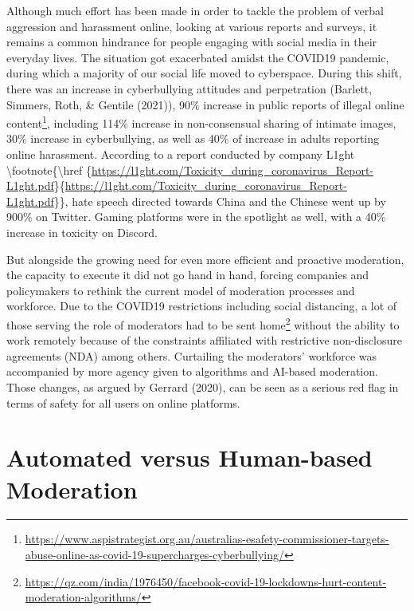 \documentclass[
  10pt,
  dvipsnames,enabledeprecatedfontcommands]{scrartcl}
\begin{document}
Although much effort has been made in order to tackle the problem of
verbal aggression and harassment online, looking at various reports and
surveys, it remains a common hindrance for people engaging with social
media in their everyday lives. The situation got exacerbated amidst the
COVID19 pandemic, during which a majority of our social life moved to
cyberspace. During this shift, there was an increase in cyberbullying
attitudes and perpetration (Barlett, Simmers, Roth, \& Gentile (2021)),
90\% increase in public reports of illegal online
content\footnote{\href {https://www.aspistrategist.org.au/australias-esafety-commissioner-targets-abuse-online-as-covid-19-supercharges-cyberbullying/}{https://www.aspistrategist.org.au/australias-esafety-commissioner-targets-abuse-online-as-covid-19-supercharges-cyberbullying/}},
including 114\% increase in non-consensual sharing of intimate images,
30\% increase in cyberbullying, as well as 40\% of increase in adults
reporting online harassment. According to a report conducted by company
L1ght \textbackslash footnote\{\textbackslash href
\{\url{https://l1ght.com/Toxicity_during_coronavirus_Report-L1ght.pdf}\}\{\url{https://l1ght.com/Toxicity_during_coronavirus_Report-L1ght.pdf}\}\},
hate speech directed towards China and the Chinese went up by 900\% on
Twitter. Gaming platforms were in the spotlight as well, with a 40\%
increase in toxicity on Discord.

But alongside the growing need for even more efficient and proactive
moderation, the capacity to execute it did not go hand in hand, forcing
companies and policymakers to rethink the current model of moderation
processes and workforce. Due to the COVID19 restrictions including
social distancing, a lot of those serving the role of moderators had to
be sent
home\footnote{\href {https://qz.com/india/1976450/facebook-covid-19-lockdowns-hurt-content-moderation-algorithms/}{https://qz.com/india/1976450/facebook-covid-19-lockdowns-hurt-content-moderation-algorithms/}}
without the ability to work remotely because of the constraints
affiliated with restrictive non-disclosure agreements (NDA) among
others. Curtailing the moderators' workforce was accompanied by more
agency given to algorithms and AI-based moderation. Those changes, as
argued by Gerrard (2020), can be seen as a serious red flag in terms of
safety for all users on online platforms.

\hypertarget{automated-versus-human-based-moderation}{%
\section{Automated versus Human-based
Moderation}\label{automated-versus-human-based-moderation}}
\end{document}
